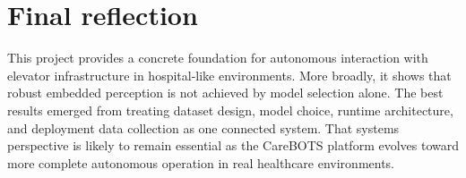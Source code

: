 \section{Final reflection}

This project provides a concrete foundation for autonomous interaction with
elevator infrastructure in hospital-like environments. More broadly, it shows
that robust embedded perception is not achieved by model selection alone. The
best results emerged from treating dataset design, model choice, runtime
architecture, and deployment data collection as one connected system. That
systems perspective is likely to remain essential as the CareBOTS platform evolves
toward more complete autonomous operation in real healthcare environments.
